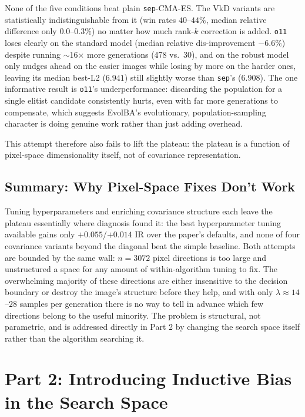 \documentclass[11pt, a4paper]{article}
\begin{document}
None of the five conditions beat plain \texttt{sep}-CMA-ES. The VkD variants are statistically indistinguishable from it (win rates $40$--$44\%$, median relative difference only $0.0$--$0.3\%$) no matter how much rank-$k$ correction is added. \texttt{o11} loses clearly on the standard model (median relative dis-improvement $-6.6\%$) despite running $\sim$16$\times$ more generations (478 vs.\ 30), and on the robust model only nudges ahead on the easier images while losing by more on the harder ones, leaving its median best-L2 ($6.941$) still slightly worse than \texttt{sep}'s ($6.908$). The one informative result is \texttt{o11}'s underperformance: discarding the population for a single elitist candidate consistently hurts, even with far more generations to compensate, which suggests EvolBA's evolutionary, population-sampling character is doing genuine work rather than just adding overhead.

This attempt therefore also fails to lift the plateau: the plateau is a function of pixel-space dimensionality itself, not of covariance representation.

\subsection{Summary: Why Pixel-Space Fixes Don't Work}

Tuning hyperparameters and enriching covariance structure each leave the plateau essentially where diagnosis found it: the best hyperparameter tuning available gains only $+0.055$/$+0.014$ IR over the paper's defaults, and none of four covariance variants beyond the diagonal beat the simple baseline. Both attempts are bounded by the same wall: $n=3072$ pixel directions is too large and unstructured a space for any amount of within-algorithm tuning to fix. The overwhelming majority of these directions are either insensitive to the decision boundary or destroy the image's structure before they help, and with only $\lambda\approx14$--$28$ samples per generation there is no way to tell in advance which few directions belong to the useful minority. The problem is structural, not parametric, and is addressed directly in Part 2 by changing the search space itself rather than the algorithm searching it.

\section{Part 2: Introducing Inductive Bias in the Search Space}
\label{sec:inductive_bias}
\end{document}
